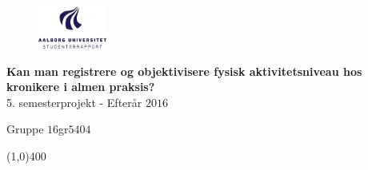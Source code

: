 \clearpage
\thispagestyle{empty}

\begin{figure}[H]
	\raggedleft
		\includegraphics[width=0.2\textwidth]{figures/aaulogo-da.png}
\end{figure} 
\vspace*{\fill} 
\begin{center}	
\begin{Huge}
\textbf{Kan man registrere og objektivisere fysisk aktivitetsniveau hos kronikere i almen praksis?}\\
\vspace{5 mm}
5. semesterprojekt - Efterår $2016$\\
\vspace{3 mm}
\end{Huge}
{\Large Gruppe $16$gr$5404$}
\end{center}
\vspace*{\fill}

\begin{center}
\line(1,0){400}
\end{center}